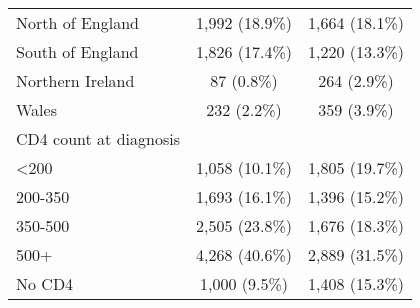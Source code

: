 \begin{table}[!h]
\begin{tabular}[t]{lcc}
\hspace{1em}North of England & 1,992 (18.9\%) & 1,664 (18.1\%)\\
\hspace{1em}South of England & 1,826 (17.4\%) & 1,220 (13.3\%)\\
\hspace{1em}Northern Ireland & 87 (0.8\%) & 264 (2.9\%)\\
\hspace{1em}Wales & 232 (2.2\%) & 359 (3.9\%)\\
CD4 count at diagnosis &  & \\
\hspace{1em}<200 & 1,058 (10.1\%) & 1,805 (19.7\%)\\
\hspace{1em}200-350 & 1,693 (16.1\%) & 1,396 (15.2\%)\\
\hspace{1em}350-500 & 2,505 (23.8\%) & 1,676 (18.3\%)\\
\hspace{1em}500+ & 4,268 (40.6\%) & 2,889 (31.5\%)\\
\hspace{1em}No CD4 & 1,000 (9.5\%) & 1,408 (15.3\%)\\
\bottomrule
\end{tabular}
\end{table}
